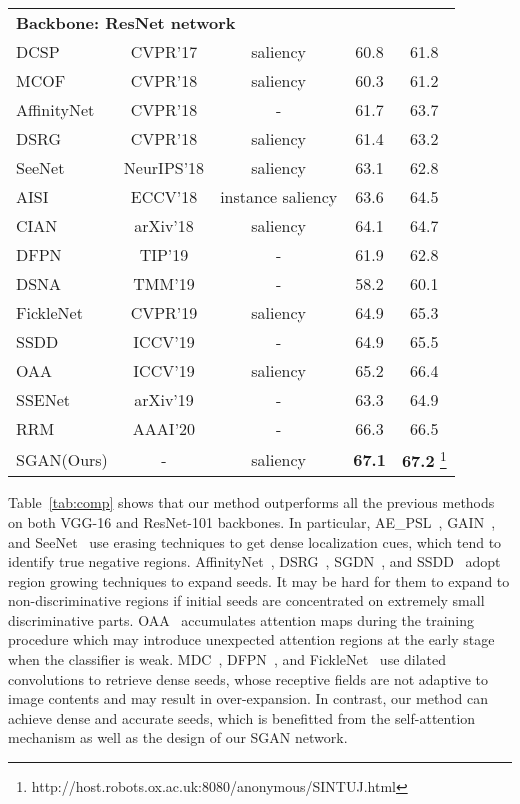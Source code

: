 \documentclass[journal]{IEEEtran}
\begin{document}
\begin{table}[tbhp]
\begin{minipage}{1\linewidth}
\begin{tabular}{lcccc}
			\multicolumn{4}{l}{\textbf{Backbone: ResNet network}} \\
			DCSP~\cite{chaudhry2017discovering} &CVPR'17	 & saliency  	 &60.8  &61.8 \\
			MCOF~\cite{wang2018weakly} 			&CVPR'18	 & saliency  	 &60.3  &61.2 \\
			AffinityNet~\cite{ahn2018learning} &CVPR'18	 &- 			 	 &61.7  &63.7 \\  DSRG~\cite{huang2018weakly} 		&CVPR'18	 & saliency  	 &61.4  &63.2 \\
			SeeNet~\cite{hou2018self} 			&NeurIPS'18 & saliency  	 &63.1 	&62.8 \\
			AISI~\cite{fan2018associating} 		&ECCV'18 	 & instance saliency &63.6  &64.5 \\
			CIAN~\cite{fan2018cian} 			&arXiv'18   & saliency   	 &64.1  &64.7 \\
			DFPN~\cite{Jing2019dilated} 		&TIP'19	 & -     &61.9  &62.8 \\
			DSNA~\cite{Zhang2019attention}      &TMM'19     & -  	 &58.2  &60.1 \\
			FickleNet~\cite{lee2019ficklenet} 	&CVPR'19    & saliency  	 &64.9 	&65.3 \\
			SSDD~\cite{Shimoda_2019_ICCV} 		&ICCV'19	 &- 			     &64.9  &65.5 \\
			OAA~\cite{jiang2019integral} 		&ICCV'19 	 & saliency    &65.2  &66.4 \\
			SSENet~\cite{SSENet}						&arXiv'19	 & - &63.3 &64.9 \\
			RRM~\cite{Zhang2020}						&AAAI'20		& -	&	66.3 & 66.5 \\
SGAN(Ours) &- & saliency  &\textbf{67.1} &\textbf{67.2} \footnote{http://host.robots.ox.ac.uk:8080/anonymous/SINTUJ.html} \\ \hline \end{tabular}
	\end{minipage}
\end{table}


Table~\ref{tab:comp} shows that our method outperforms all the previous methods on both VGG-16 and ResNet-101 backbones. In particular, AE\_PSL~\cite{wei2017object}, GAIN~\cite{li2018tell}, and SeeNet~\cite{hou2018self} use erasing techniques to get dense localization cues, which tend to identify true negative regions. AffinityNet~\cite{ahn2018learning}, DSRG~\cite{huang2018weakly}, SGDN~\cite{Sun2019saliency}, and SSDD~\cite{Shimoda_2019_ICCV} adopt region growing techniques to expand seeds. It may be hard for them to expand to non-discriminative regions if initial seeds are concentrated on extremely small discriminative parts. OAA~\cite{jiang2019integral} accumulates attention maps during the training procedure which may introduce unexpected attention regions at the early stage when the classifier is weak. MDC~\cite{wei2018revisiting}, DFPN~\cite{Jing2019dilated}, and FickleNet~\cite{lee2019ficklenet} use dilated convolutions to retrieve dense seeds, whose receptive fields are not adaptive to image contents and may result in over-expansion. In contrast, our method can achieve dense and accurate seeds, which is benefitted from the self-attention mechanism as well as the design of our SGAN network. 
\end{document}
